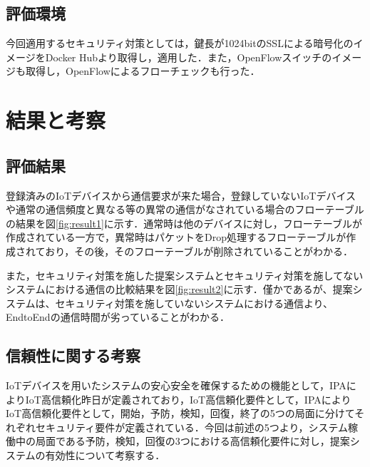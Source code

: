 \documentclass[Japanese]{dicomopapers}
\begin{document}
\subsection{評価環境}
今回適用するセキュリティ対策としては，鍵長が1024bitのSSLによる暗号化のイメージをDocker Hubより取得し，適用した．また，OpenFlowスイッチのイメージも取得し，OpenFlowによるフローチェックも行った．

\section{結果と考察}



\subsection{評価結果}
登録済みのIoTデバイスから通信要求が来た場合，登録していないIoTデバイスや通常の通信頻度と異なる等の異常の通信がなされている場合のフローテーブルの結果を図\ref{fig:result1}に示す．通常時は他のデバイスに対し，フローテーブルが作成されている一方で，異常時はパケットをDrop処理するフローテーブルが作成されており，その後，そのフローテーブルが削除されていることがわかる．\par
また，セキュリティ対策を施した提案システムとセキュリティ対策を施してないシステムにおける通信の比較結果を図\ref{fig:result2}に示す．僅かであるが、提案システムは、セキュリティ対策を施していないシステムにおける通信より、EndtoEndの通信時間が劣っていることがわかる．

\subsection{信頼性に関する考察}
IoTデバイスを用いたシステムの安心安全を確保するための機能として，IPAによりIoT高信頼化昨日が定義されており，IoT高信頼化要件として，IPAによりIoT高信頼化要件として，開始，予防，検知，回復，終了の5つの局面に分けてそれぞれセキュリティ要件が定義されている\cite{IPA}．今回は前述の5つより，システム稼働中の局面である予防，検知，回復の3つにおける高信頼化要件に対し，提案システムの有効性について考察する．
\end{document}
